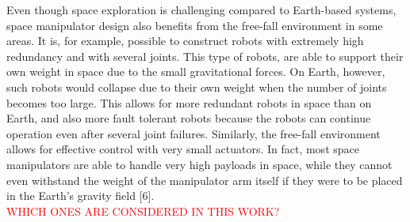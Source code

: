 \documentclass[a4paper,12pt,oneside]{report}
\begin{document}
Even though space exploration is challenging compared to Earth-based systems, space manipulator design also benefits from the free-fall environment in some areas. It is, for example, possible to construct robots with extremely high redundancy and with several joints. This type of robots, are able to support their own weight in space due to the small gravitational forces. On Earth, however, such robots would collapse due to their own weight when the number of joints becomes too large. This allows for more redundant robots in space than on Earth, and also more fault tolerant robots because the robots can continue operation even after several joint failures. Similarly, the free-fall environment allows for effective control with very small actuators. In fact, most space manipulators are able to handle very high payloads in space, while they cannot even withstand the weight of the manipulator arm itself if they were to be placed in the Earth’s gravity field [6].\\
\textcolor{red}{WHICH ONES ARE CONSIDERED IN THIS WORK?}\\
\end{document}
